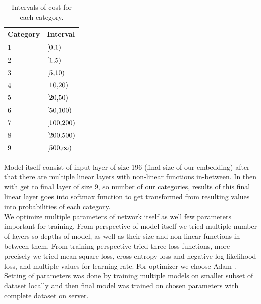 \begin{table}[!h]
	\centering
	\begin{tabular}{|l|l|}
		\hline
		Category  & Interval \\ \hline
		1 & $\interval[{0,1})$ \\ \hline
		2 & $\interval[{1,5})$ \\ \hline
		3 & $\interval[{5,10})$ \\ \hline
		4 & $\interval[{10,20})$ \\ \hline
		5 & $\interval[{20,50})$ \\ \hline
		6 & $\interval[{50,100})$ \\ \hline
		7 & $\interval[{100,200})$ \\ \hline
		8 & $\interval[{200,500})$ \\ \hline
		9 & $\interval[{500,\infty})$ \\ \hline
	\end{tabular}
	\caption{Intervals of cost for each category.}
	\label{tab:cat_interval_record}
\end{table}  

Model itself consist of input layer of size 196 (final size of our embedding) after that there are multiple linear layers with non-linear functions in-between. In then with get to final layer of size 9, so number of our categories, results of this final linear layer goes into softmax function to get transformed from resulting values into probabilities of each category. 
\\

We optimize multiple parameters of network itself as well few parameters important for training. From perspective of model itself we tried multiple number of layers so depths of model, as well as their size and non-linear functions in-between them. From training perspective tried three loss functions, more precisely we tried mean square loss, cross entropy loss and negative log likelihood loss, and multiple values for learning rate. For optimizer we choose Adam \cite{adam}.  
\\

Setting of parameters was done by training multiple models on smaller subset of dataset locally and then final model was trained on chosen parameters with complete dataset on server.
